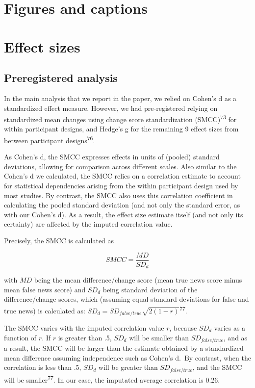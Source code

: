 \documentclass[
  man]{apa6}
\begin{document}
\endgroup
\newpage

\section{Figures and captions}\label{figures-and-captions}

\newpage

\appendix


\section{Effect sizes}\label{effect-sizes}

\subsection{Preregistered analysis}\label{preregistered-analysis}

\FloatBarrier

In the main analysis that we report in the paper, we relied on Cohen's d as a standardized effect measure. However, we had pre-registered relying on standardized mean changes using change score standardization (SMCC)\textsuperscript{73} for within participant designs, and Hedge's g for the remaining 9 effect sizes from between participant designs\textsuperscript{76}.

As Cohen's d, the SMCC expresses effects in units of (pooled) standard deviations, allowing for comparison across different scales. Also similar to the Cohen's d we calculated, the SMCC relies on a correlation estimate to account for statistical dependencies arising from the within participant design used by most studies. By contrast, the SMCC also uses this correlation coefficient in calculating the pooled standard deviation (and not only the standard error, as with our Cohen's d). As a result, the effect size estimate itself (and not only its certainty) are affected by the imputed correlation value.

Precisely, the SMCC is calculated as

\[
SMCC = \frac{MD}{SD_d}
\]

with \(MD\) being the mean difference/change score (mean true news score minus mean false news score) and \(SD_d\) being standard deviation of the difference/change scores, which (assuming equal standard deviations for false and true news) is calculated as: \(SD_d = SD_{false/true}\sqrt{2(1-r)}\)\textsuperscript{77}.

The SMCC varies with the imputed correlation value \(r\), because \(SD_d\) varies as a function of \(r\). If \(r\) is greater than .5, \(SD_d\) will be smaller than \(SD_{false/true}\), and as a result, the SMCC will be larger than the estimate obtained by a standardized mean difference assuming independence such as Cohen's d.~By contrast, when the correlation is less than .5, \(SD_d\) will be greater than \(SD_{false/true}\), and the SMCC will be smaller\textsuperscript{77}. In our case, the imputated average correlation is 0.26.
\end{document}

